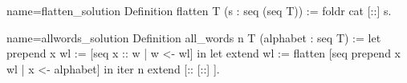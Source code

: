 
\begin{Answer}[ref=ex:flatten]

\begin{coq}{name=flatten_solution}{}
Definition flatten T (s : seq (seq T)) := foldr cat [::] s.
\end{coq}

\end{Answer}

\begin{Answer}[ref=ex:allwords]

\begin{coq}{name=allwords_solution}{}
Definition all_words n T (alphabet : seq T) :=
  let prepend x wl := [seq x :: w | w <- wl] in
  let extend wl := flatten [seq prepend x wl | x <- alphabet] in
  iter n extend [:: [::] ].
\end{coq}

\end{Answer}





